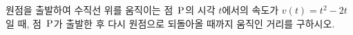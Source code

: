 원점을 출발하여 수직선 위를 움직이는 점~$\mathrm{P}$의 시각 $t$에서의 속도가 $v(t)=t^2-2t$일 때, 점~$\mathrm{P}$가 출발한 후 다시 원점으로 되돌아올 때까지 움직인 거리를 구하시오.
